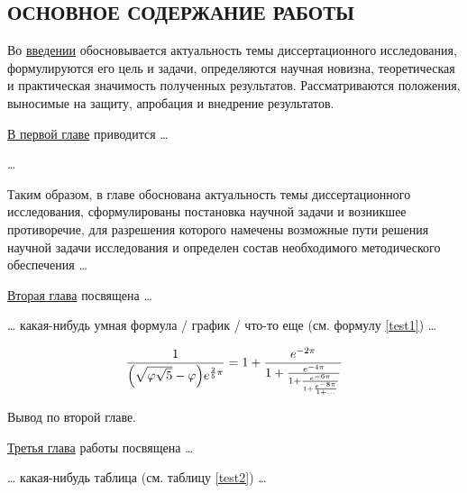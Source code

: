
\subsection*{\MakeUppercase{Основное содержание работы}}

Во \underline{введении} обосновывается актуальность темы
диссертационного исследования, формулируются его цель и задачи,
определяются научная новизна, теоретическая и практическая значимость
полученных результатов. Рассматриваются положения, выносимые на
защиту, апробация и внедрение результатов.



\underline{В первой главе} приводится \dots{}

\dots{}

Таким образом, в главе обоснована актуальность темы диссертационного
исследования, сформулированы постановка научной задачи и возникшее
противоречие, для разрешения которого намечены возможные пути решения
научной задачи исследования и определен состав необходимого
методического обеспечения \dots{}


\underline{Вторая глава} посвящена \dots{}

\dots{} какая-нибудь умная формула / график / что-то еще (см. формулу
\ref{test1}) \dots{}

\begin{center}
\begin{equation} \label{test1}
\frac{1}{\Bigl(\sqrt{\phi \sqrt{5}}-\phi\Bigr) e^{\frac25 \pi}} =
1+\frac{e^{-2\pi}} {1+\frac{e^{-4\pi}} {1+\frac{e^{-6\pi}}
{1+\frac{e^{-8\pi}} {1+\ldots} } } }
\end{equation}
\end{center}

Вывод по второй главе.


\underline{Третья глава} работы посвящена \dots{}

\dots{} какая-нибудь таблица (см. таблицу \ref{test2}) \dots{}

